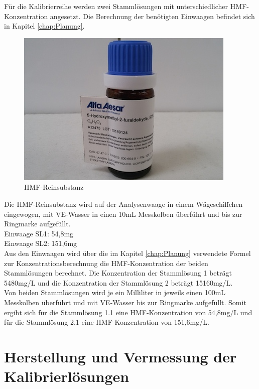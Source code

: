 Für die Kalibrierreihe werden zwei Stammlösungen mit unterschiedlicher HMF-Konzentration angesetzt. Die Berechnung der benötigten Einwaagen befindet sich in Kapitel \ref{chap:Planung}.\\
\begin{figure}[htbp]
	\centering
		\includegraphics{../Bilder/20150504_140727.jpg}
	\caption{HMF-Reinsubstanz}
	\label{fig:HMF-Reinsubstanz}
\end{figure}
Die HMF-Reinsubstanz wird auf der Analysenwaage in einem Wägeschiffchen eingewogen, mit VE-Wasser in einen 10mL Messkolben überführt und bis zur Ringmarke aufgefüllt.\\
Einwaage SL1: 54,8mg\\
Einwaage SL2: 151,6mg\\
Aus den Einwaagen wird über die im Kapitel \ref{chap:Planung} verwendete Formel zur Konzentrationsberechnung die HMF-Konzentration der beiden Stammlösungen berechnet. Die Konzentration der Stammlösung 1 beträgt 5480mg/L und die Konzentration der Stammlösung 2 beträgt 15160mg/L.\\ 
Von beiden Stammlösungen wird je ein Milliliter in jeweils einen 100mL Messkolben überführt und mit VE-Wasser bis zur Ringmarke aufgefüllt. Somit ergibt sich für die Stammlösung 1.1 eine HMF-Konzentration von 54,8mg/L und für die Stammlösung 2.1 eine HMF-Konzentration von 151,6mg/L. 

\section{Herstellung und Vermessung der Kalibrierlösungen}

